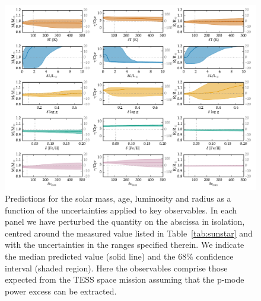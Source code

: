 \iffalse
\begin{figure}
    \centering
    \includegraphics[width=0.95\textheight,height=0.95\textwidth,keepaspectratio, angle=90]{tess2.pdf}
    \caption{Predictions for the solar mass, age, luminosity and radius as a function of the uncertainties applied to key observables. In each panel we have perturbed the quantity on the abscissa in isolation, centred around the measured value listed in  Table~\ref{tab:sunstar} and with the uncertainties in the ranges specified therein. We indicate the median predicted value (solid line) and the  $68\%$  confidence interval (shaded region). Here the observables comprise those expected from the TESS space mission assuming that the p-mode power excess can be extracted.} 
    \label{fig:uncerttess}
\end{figure}

